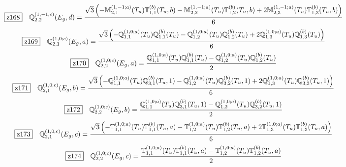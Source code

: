 \documentclass[fleqn,10pt,landscape]{jsarticle}
\begin{document}
\begin{dmath*}
\hspace*{3mm}\fbox{z168}\quad \mathbb{Q}_{2,2}^{(1,-1;c)}(E_{g},d)=\frac{\sqrt{3} \left(- \mathbb{M}_{2,1}^{(1,-1;a)}(T_{u}) \mathbb{T}_{1,1}^{(b)}(T_{u},b) - \mathbb{M}_{2,2}^{(1,-1;a)}(T_{u}) \mathbb{T}_{1,2}^{(b)}(T_{u},b) + 2 \mathbb{M}_{2,3}^{(1,-1;a)}(T_{u}) \mathbb{T}_{1,3}^{(b)}(T_{u},b)\right)}{6}
\end{dmath*}
\begin{dmath*}
\hspace*{3mm}\fbox{z169}\quad \mathbb{Q}_{2,1}^{(1,0;c)}(E_{g},a)=\frac{\sqrt{3} \left(- \mathbb{Q}_{1,1}^{(1,0;a)}(T_{u}) \mathbb{Q}_{1,1}^{(b)}(T_{u}) - \mathbb{Q}_{1,2}^{(1,0;a)}(T_{u}) \mathbb{Q}_{1,2}^{(b)}(T_{u}) + 2 \mathbb{Q}_{1,3}^{(1,0;a)}(T_{u}) \mathbb{Q}_{1,3}^{(b)}(T_{u})\right)}{6}
\end{dmath*}
\begin{dmath*}
\hspace*{3mm}\fbox{z170}\quad \mathbb{Q}_{2,2}^{(1,0;c)}(E_{g},a)=\frac{\mathbb{Q}_{1,1}^{(1,0;a)}(T_{u}) \mathbb{Q}_{1,1}^{(b)}(T_{u}) - \mathbb{Q}_{1,2}^{(1,0;a)}(T_{u}) \mathbb{Q}_{1,2}^{(b)}(T_{u})}{2}
\end{dmath*}
\begin{dmath*}
\hspace*{3mm}\fbox{z171}\quad \mathbb{Q}_{2,1}^{(1,0;c)}(E_{g},b)=\frac{\sqrt{3} \left(- \mathbb{Q}_{1,1}^{(1,0;a)}(T_{u}) \mathbb{Q}_{3,1}^{(b)}(T_{u},1) - \mathbb{Q}_{1,2}^{(1,0;a)}(T_{u}) \mathbb{Q}_{3,2}^{(b)}(T_{u},1) + 2 \mathbb{Q}_{1,3}^{(1,0;a)}(T_{u}) \mathbb{Q}_{3,3}^{(b)}(T_{u},1)\right)}{6}
\end{dmath*}
\begin{dmath*}
\hspace*{3mm}\fbox{z172}\quad \mathbb{Q}_{2,2}^{(1,0;c)}(E_{g},b)=\frac{\mathbb{Q}_{1,1}^{(1,0;a)}(T_{u}) \mathbb{Q}_{3,1}^{(b)}(T_{u},1) - \mathbb{Q}_{1,2}^{(1,0;a)}(T_{u}) \mathbb{Q}_{3,2}^{(b)}(T_{u},1)}{2}
\end{dmath*}
\begin{dmath*}
\hspace*{3mm}\fbox{z173}\quad \mathbb{Q}_{2,1}^{(1,0;c)}(E_{g},c)=\frac{\sqrt{3} \left(- \mathbb{T}_{1,1}^{(1,0;a)}(T_{u}) \mathbb{T}_{1,1}^{(b)}(T_{u},a) - \mathbb{T}_{1,2}^{(1,0;a)}(T_{u}) \mathbb{T}_{1,2}^{(b)}(T_{u},a) + 2 \mathbb{T}_{1,3}^{(1,0;a)}(T_{u}) \mathbb{T}_{1,3}^{(b)}(T_{u},a)\right)}{6}
\end{dmath*}
\begin{dmath*}
\hspace*{3mm}\fbox{z174}\quad \mathbb{Q}_{2,2}^{(1,0;c)}(E_{g},c)=\frac{\mathbb{T}_{1,1}^{(1,0;a)}(T_{u}) \mathbb{T}_{1,1}^{(b)}(T_{u},a) - \mathbb{T}_{1,2}^{(1,0;a)}(T_{u}) \mathbb{T}_{1,2}^{(b)}(T_{u},a)}{2}
\end{dmath*}
\end{document}
